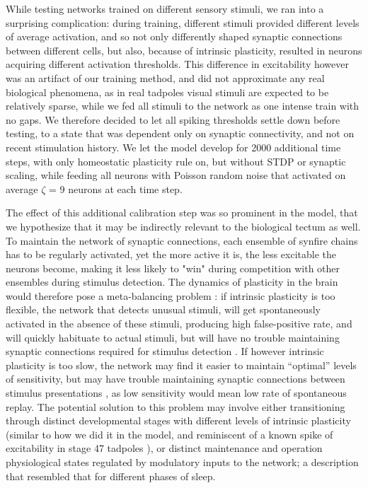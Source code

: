 \documentclass{article}
\begin{document}
While testing networks trained on different sensory stimuli, we ran into a surprising complication: during training, different stimuli provided different levels of average activation, and so not only differently shaped synaptic connections between different cells, but also, because of intrinsic plasticity, resulted in neurons acquiring different activation thresholds. This difference in excitability however was an artifact of our training method, and did not approximate any real biological phenomena, as in real tadpoles visual stimuli are expected to be relatively sparse, while we fed all stimuli to the network as one intense train with no gaps. We therefore decided to let all spiking thresholds settle down before testing, to a state that was dependent only on synaptic connectivity, and not on recent stimulation history. We let the model develop for 2000 additional time steps, with only homeostatic plasticity rule on, but without STDP or synaptic scaling, while feeding all neurons with Poisson random noise that activated on average $\zeta$ = 9 neurons at each time step. 

The effect of this additional calibration step was so prominent in the model, that we hypothesize that it may be indirectly relevant to the biological tectum as well. To maintain the network of synaptic connections, each ensemble of synfire chains has to be regularly activated, yet the more active it is, the less excitable the neurons become, making it less likely to "win" during competition with other ensembles during stimulus detection. The dynamics of plasticity in the brain would therefore pose a meta-balancing problem \citep{zenke2017temporal}: if intrinsic plasticity is too flexible, the network that detects unusual stimuli, will get spontaneously activated in the absence of these stimuli, producing high false-positive rate, and will quickly habituate to actual stimuli, but will have no trouble maintaining synaptic connections required for stimulus detection \citep{litwin2014assemblies}. If however intrinsic plasticity is too slow, the network may find it easier to maintain “optimal” levels of sensitivity, but may have trouble maintaining synaptic connections between stimulus presentations \citep{triplett2018emergence}, as low sensitivity would mean low rate of spontaneous replay. The potential solution to this problem may involve either transitioning through distinct developmental stages with different levels of intrinsic plasticity (similar to how we did it in the model, and reminiscent of a known spike of excitability in stage 47 tadpoles \citep{hamodi2014,ciarleglio2015}), or distinct maintenance and operation physiological states regulated by modulatory inputs to the network; a description that resembled that for different phases of sleep.
\end{document}
